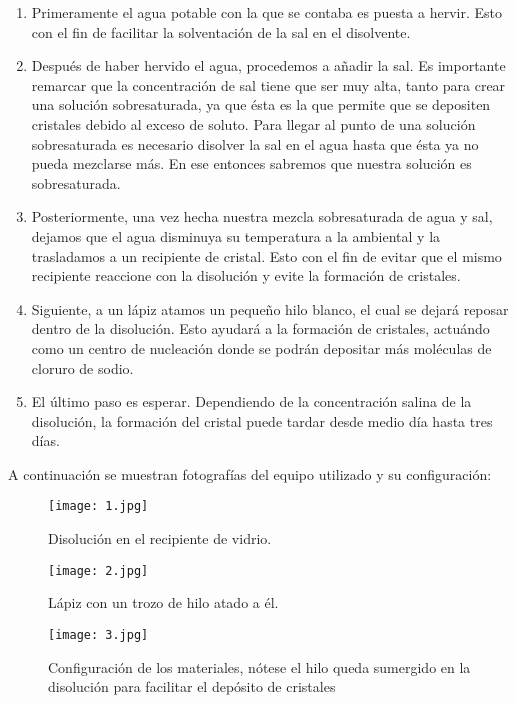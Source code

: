 \documentclass[letterpaper]{article}
\begin{document}
\begin{enumerate}
	\item Primeramente el agua potable con la que se contaba es puesta a hervir. Esto con el fin de facilitar la solventación de la sal en el disolvente.
	\item Después de haber hervido el agua, procedemos a añadir la sal. Es importante remarcar que la concentración de sal tiene que ser muy alta, tanto para crear una solución sobresaturada, ya que ésta es la que permite que se depositen cristales debido al exceso de soluto. Para llegar al punto de una solución sobresaturada es necesario disolver la sal en el agua hasta que ésta ya no pueda mezclarse más. En ese entonces sabremos que nuestra solución es sobresaturada.
	\item Posteriormente, una vez hecha nuestra mezcla sobresaturada de agua y sal, dejamos que el agua disminuya su temperatura a la ambiental y la trasladamos a un recipiente de cristal. Esto con el fin de evitar que el mismo recipiente reaccione con la disolución y evite la formación de cristales.
	\item Siguiente, a un lápiz atamos un pequeño hilo blanco, el cual se dejará reposar dentro de la disolución. Esto ayudará a la formación de cristales, actuándo como un centro de nucleación donde se podrán depositar más moléculas de cloruro de sodio.
	\item El último paso es esperar. Dependiendo de la concentración salina de la disolución, la formación del cristal puede tardar desde medio día hasta tres días.
\end{enumerate}

A continuación se muestran fotografías del equipo utilizado y su configuración:

\begin{figure}[H]
	\centering
	\texttt{[image: 1.jpg]}
	\caption{Disolución en el recipiente de vidrio.}
\end{figure}

\begin{figure}[H]
	\centering
	\texttt{[image: 2.jpg]}
	\caption{Lápiz con un trozo de hilo atado a él.}
\end{figure}

\begin{figure}[H]
	\centering
	\texttt{[image: 3.jpg]}
	\caption{Configuración de los materiales, nótese el hilo queda sumergido en la disolución para facilitar el depósito de cristales}
\end{figure}
\end{document}
